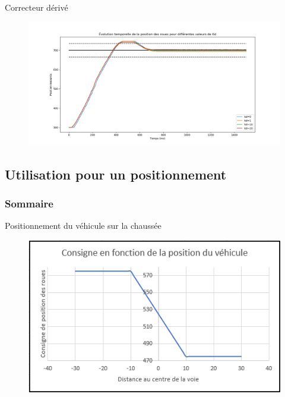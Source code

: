 \documentclass[french, handout]{beamer}
\begin{document}
            \begin{frame}{Correcteur dérivé}
                \begin{figure}
                    \centering
                    \hspace*{-4.2em}
                    \includegraphics[width=14cm]{deter_kd.png}
                \end{figure}
            \end{frame}
            
        \subsection{Utilisation pour un positionnement}
        \begin{frame}
        \frametitle{Sommaire}
        \tableofcontents[sections=4, currentsubsection]
        \end{frame}
        \begin{frame}{Positionnement du véhicule sur la chaussée}
            \begin{figure}
                \centering
                \includegraphics[scale=0.8]{loi_commande.png}
            \end{figure}
        \end{frame}
        
\end{document}
